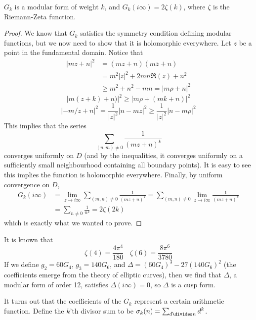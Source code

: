 \begin{theorem}
    $G_k$ is a modular form of weight $k$, and $G_k(i \infty) = 2 \zeta(k)$, where $\zeta$ is the Riemann-Zeta function.
\end{theorem}
\begin{proof}
    We know that $G_k$ satisfies the symmetry condition defining modular functions, but we now need to show that it is holomorphic everywhere. Let $z$ be a point in the fundamental domain. Notice that
    \begin{align*}
        |mz + n|^2 &= (mz + n)(m \overline{z} + n)\\
        &= m^2 |z|^2 + 2mn \Re(z) + n^2\\
        &\geq m^2 + n^2 - mn = |m \rho + n|^2
    \end{align*}
    \[ |m(z + k) + n)|^2 \geq |m \rho + (mk+n)|^2 \]
    \[ |-m/z + n|^2 = \frac{1}{|z|^2} |n - mz|^2 \geq \frac{1}{|z|^2} |n - m \rho|^2 \]
    This implies that the series
    \[ \sum_{(n,m) \neq 0} \frac{1}{(mz + n)^{k}} \]
    converges uniformly on $D$ (and by the inequalities, it converges uniformly on a sufficiently small neighbourhood containing all boundary points). It is easy to see this implies the function is holomorphic everywhere. Finally, by uniform convergence on $D$,
    \begin{align*}
        G_k(i \infty) &= \lim_{z \to i \infty} \sum_{(m,n) \neq 0} \frac{1}{(mz + n)^{k}} = \sum_{(m,n) \neq 0} \lim_{z \to i \infty} \frac{1}{(mz + n)^{k}}\\
        &= \sum_{n \neq 0} \frac{1}{n^{k}} = 2 \zeta(2k)
    \end{align*}
    which is exactly what we wanted to prove.
\end{proof}

\begin{example}
    It is known that
    \[ \zeta(4) = \frac{4 \pi^4}{180}\ \ \ \ \zeta(6) = \frac{8 \pi^6}{3780} \]
    If we define $g_2 = 60 G_4$, $g_3 = 140 G_6$, and $\Delta = (60 G_4)^3 - 27 (140 G_6)^2$ (the coefficients emerge from the theory of elliptic curves), then we find that $\Delta$, a modular form of order 12, satisfies $\Delta(i \infty) = 0$, so $\Delta$ is a cusp form.
\end{example}

It turns out that the coefficients of the $G_k$ represent a certain arithmetic function. Define the $k$'th divisor sum to be $\sigma_k(n) = \sum_{d \divides n} d^k$.

